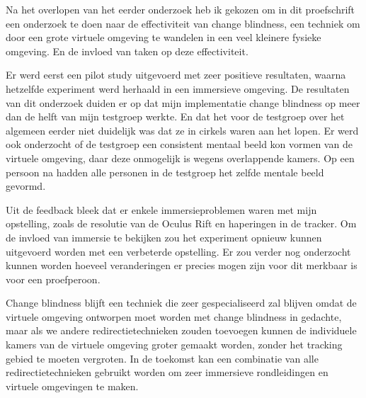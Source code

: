 Na het overlopen van het eerder onderzoek heb ik gekozen om in dit proefschrift
een onderzoek te doen naar de effectiviteit van change blindness, een techniek 
om door een grote virtuele omgeving te wandelen in een veel kleinere fysieke 
omgeving. En de invloed van taken op deze effectiviteit. 

Er werd eerst een pilot study uitgevoerd met zeer positieve resultaten, waarna
hetzelfde experiment werd herhaald in een immersieve omgeving. De resultaten van 
dit onderzoek duiden er op dat mijn implementatie change blindness op meer dan de
helft van mijn testgroep werkte. En dat het voor de testgroep over het algemeen
eerder niet duidelijk was dat ze in cirkels waren aan het lopen. Er werd ook
onderzocht of de testgroep een consistent mentaal beeld kon vormen van de
virtuele omgeving, daar deze onmogelijk is wegens overlappende kamers. Op een
persoon na hadden alle personen in de testgroep het zelfde mentale beeld gevormd.

Uit de feedback bleek dat er enkele immersieproblemen waren met mijn opstelling,
zoals de resolutie van de Oculus Rift en haperingen in de tracker. Om de invloed 
van immersie te bekijken zou het experiment opnieuw kunnen uitgevoerd worden met 
een verbeterde opstelling. Er zou verder nog onderzocht kunnen worden hoeveel 
veranderingen er precies mogen zijn voor dit merkbaar is voor een proefperoon.

Change blindness blijft een techniek die zeer gespecialiseerd zal blijven omdat
de virtuele omgeving ontworpen moet worden met change blindness in gedachte, maar
als we andere redirectietechnieken zouden toevoegen kunnen de individuele kamers
van de virtuele omgeving groter gemaakt worden, zonder het tracking gebied te 
moeten vergroten. In de toekomst kan een combinatie van alle redirectietechnieken
gebruikt worden om zeer immersieve rondleidingen en virtuele omgevingen te maken.